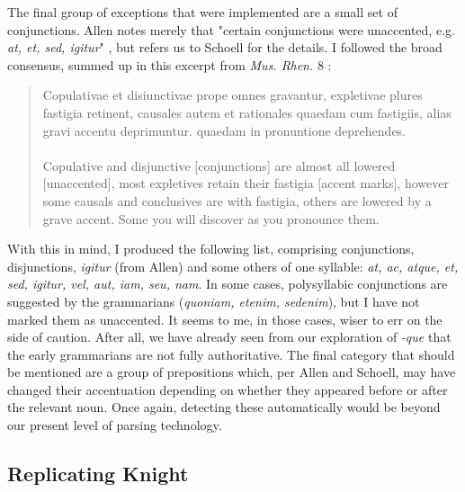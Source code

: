 \documentclass[11pt,a4paper]{scrartcl} %
\begin{document}
{The final group of exceptions that were implemented are a small set of conjunctions. Allen notes merely that "certain conjunctions were unaccented, e.g. \textit{at, et, sed, igitur}" \cite[88]{sidney1965vox}, but refers us to Schoell for the details. I followed the broad consensus, summed up in this excerpt from \textit{Mus. Rhen.} 8 \cite[194]{schoell}:
\begin{quote}
Copulativae et disiunctivae prope omnes gravantur, expletivae plures fastigia retinent, causales autem et rationales quaedam cum fastigiis, alias gravi accentu deprimuntur. quaedam in pronuntione deprehendes.
\\
\\
Copulative and disjunctive [conjunctions] are almost all lowered [unaccented], most expletives retain their fastigia [accent marks], however some causals and conclusives are with fastigia, others are lowered by a grave accent. Some you will discover as you pronounce them.
\end{quote}
With this in mind, I produced the following list, comprising conjunctions, disjunctions, \textit{igitur} (from Allen) and some others of one syllable: \textit{at, ac, atque, et, sed, igitur, vel, aut, iam, seu, nam}. In some cases, polysyllabic conjunctions are suggested by the grammarians (\textit{quoniam, etenim, sedenim}), but I have not marked them as unaccented. It seems to me, in those cases, wiser to err on the side of caution. After all, we have already seen from our exploration of \textit{-que} that the early grammarians are not fully authoritative. The final category that should be mentioned are a group of prepositions which, per Allen and Schoell, may have changed their accentuation depending on whether they appeared before or after the relevant noun. Once again, detecting these automatically would be beyond our present level of parsing technology.
\newpage
\subsection{Replicating Knight}

}
\end{document}
